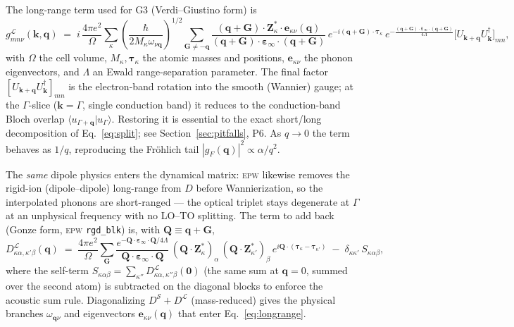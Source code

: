 \documentclass[11pt]{article}
\newcommand{\kv}{\mathbf{k}}
\newcommand{\qv}{\mathbf{q}}
\newcommand{\Gv}{\mathbf{G}}
\newcommand{\Zst}{\mathbf{Z}^{*}}
\newcommand{\epsinf}{\bm{\varepsilon}_{\infty}}
\newcommand{\glong}{g^{\mathcal{L}}}
\newcommand{\Dlong}{D^{\mathcal{L}}}
\newcommand{\Qv}{\mathbf{Q}}
\begin{document}
\noindent
The long-range term used for G3 (Verdi--Giustino form) is
\begin{equation}
  \glong_{mn\nu}(\kv,\qv) \;=\;
  i\,\frac{4\pi e^{2}}{\Omega}\sum_{\kappa}
  \left(\frac{\hbar}{2M_{\kappa}\omega_{\nu\qv}}\right)^{\!1/2}
  \sum_{\Gv\neq-\qv}
  \frac{(\qv+\Gv)\cdot\Zst_{\kappa}\cdot\mathbf{e}_{\kappa\nu}(\qv)}
       {(\qv+\Gv)\cdot\epsinf\cdot(\qv+\Gv)}\,
  e^{-i(\qv+\Gv)\cdot\bm{\tau}_{\kappa}}\,
  e^{-\frac{(\qv+\Gv)\cdot\epsinf\cdot(\qv+\Gv)}{4\Lambda}}
  \bigl[U_{\kv+\qv}U_{\kv}^{\dagger}\bigr]_{mn},
  \label{eq:longrange}
\end{equation}
with $\Omega$ the cell volume, $M_{\kappa},\bm{\tau}_{\kappa}$ the atomic masses and
positions, $\mathbf{e}_{\kappa\nu}$ the phonon eigenvectors, and $\Lambda$ an Ewald
range-separation parameter. The final factor $[U_{\kv+\qv}U_{\kv}^{\dagger}]_{mn}$ is the
electron-band rotation into the smooth (Wannier) gauge; at the $\Gamma$-slice ($\kv=\Gamma$,
single conduction band) it reduces to the conduction-band Bloch overlap
$\langle u_{\Gamma+\qv}|u_{\Gamma}\rangle$. Restoring it is essential to the exact
short/long decomposition of Eq.~\eqref{eq:split}; see Section~\ref{sec:pitfalls}, P6. As
$q\to0$ the term behaves as $1/q$, reproducing the Fr\"ohlich tail
$|g_{F}(\qv)|^{2}\propto\alpha/q^{2}$.

\noindent
The \emph{same} dipole physics enters the dynamical matrix: \textsc{epw} likewise removes
the rigid-ion (dipole--dipole) long-range from $D$ before Wannierization, so the
interpolated phonons are short-ranged --- the optical triplet stays degenerate at $\Gamma$
at an unphysical frequency with no LO--TO splitting. The term to add back (Gonze form,
\textsc{epw} \texttt{rgd\_blk}) is, with $\Qv\equiv\qv+\Gv$,
\begin{equation}
  \Dlong_{\kappa\alpha,\kappa'\beta}(\qv) \;=\; \frac{4\pi e^{2}}{\Omega}
  \sum_{\Gv}
  \frac{ e^{-\Qv\cdot\epsinf\cdot\Qv/4\Lambda} }{ \Qv\cdot\epsinf\cdot\Qv }\,
  (\Qv\!\cdot\!\Zst_{\kappa})_{\alpha}\,(\Qv\!\cdot\!\Zst_{\kappa'})_{\beta}\,
  e^{i\Qv\cdot(\bm{\tau}_{\kappa}-\bm{\tau}_{\kappa'})}
  \;-\; \delta_{\kappa\kappa'}\,S_{\kappa\alpha\beta},
  \label{eq:dynlong}
\end{equation}
where the self-term $S_{\kappa\alpha\beta}=\sum_{\kappa''}\Dlong_{\kappa\alpha,\kappa''\beta}(\mathbf{0})$
(the same sum at $\qv=0$, summed over the second atom) is subtracted on the diagonal
blocks to enforce the acoustic sum rule. Diagonalizing $D^{\mathcal{S}}+\Dlong$
(mass-reduced) gives the physical branches $\omega_{\qv\nu}$ and eigenvectors
$\mathbf{e}_{\kappa\nu}(\qv)$ that enter Eq.~\eqref{eq:longrange}.
\end{document}
